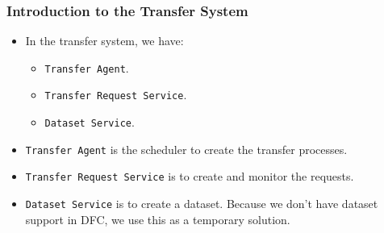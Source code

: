 \begin{frame}
    \frametitle{Introduction to the Transfer System}
    \begin{itemize}
        \item In the transfer system, we have:
        \begin{itemize}
            \item {\tt Transfer Agent}.
            \item {\tt Transfer Request Service}.
            \item {\tt Dataset Service}.
        \end{itemize}
        \item {\tt Transfer Agent} is the scheduler to create the transfer 
              processes.
        \item {\tt Transfer Request Service} is to create and monitor the requests.
        \item {\tt Dataset Service} is to create a dataset. Because we don't have
              dataset support in DFC, we use this as a temporary solution.

    \end{itemize}
\end{frame}
